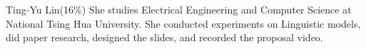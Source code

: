 \documentclass[journal]{IEEEtran}
\begin{document}
\vspace{-155mm}

\begin{IEEEbiography}{Ting-Yu Lin}(16\%)
She studies Electrical Engineering and Computer Science at National Tsing Hua University. She conducted experiments on Linguistic models, did paper research, designed the slides, and recorded the proposal video.

\end{IEEEbiography}

\end{document}

